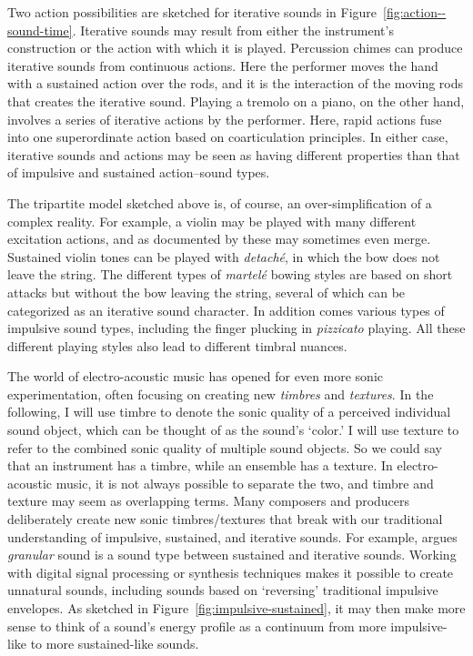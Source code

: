 Two action possibilities are sketched for iterative sounds in Figure~\ref{fig:action--sound-time}. Iterative sounds may result from either the instrument's construction or the action with which it is played. Percussion chimes can produce iterative sounds from continuous actions. Here the performer moves the hand with a sustained action over the rods, and it is the interaction of the moving rods that creates the iterative sound. Playing a tremolo on a piano, on the other hand, involves a series of iterative actions by the performer. Here, rapid actions fuse into one superordinate action based on coarticulation principles. In either case, iterative sounds and actions may be seen as having different properties than that of impulsive and sustained action--sound types.

The tripartite model sketched above is, of course, an over-simplification of a complex reality. For example, a violin may be played with many different excitation actions, and as documented by \citet{applebaum_art_1986} these may sometimes even merge. Sustained violin tones can be played with \emph{detaché}, in which the bow does not leave the string. The different types of \emph{martelé} bowing styles are based on short attacks but without the bow leaving the string, several of which can be categorized as an iterative sound character. In addition comes various types of impulsive sound types, including the finger plucking in \emph{pizzicato} playing. All these different playing styles also lead to different timbral nuances.

The world of electro-acoustic music has opened for even more sonic experimentation, often focusing on creating new \emph{timbres} and \emph{textures}. In the following, I will use timbre to denote the sonic quality of a perceived individual sound object, which can be thought of as the sound's `color.' I will use texture to refer to the combined sonic quality of multiple sound objects. So we could say that an instrument has a timbre, while an ensemble has a texture. In electro-acoustic music, it is not always possible to separate the two, and timbre and texture may seem as overlapping terms. Many composers and producers deliberately create new sonic timbres/textures that break with our traditional understanding of impulsive, sustained, and iterative sounds. For example, \citet{smalley_spectromorphology_1997} argues \emph{granular} sound is a sound type between sustained and iterative sounds. Working with digital signal processing or synthesis techniques makes it possible to create unnatural sounds, including sounds based on `reversing' traditional impulsive envelopes. As sketched in Figure~\ref{fig:impulsive-sustained}, it may then make more sense to think of a sound's energy profile as a continuum from more impulsive-like to more sustained-like sounds.

